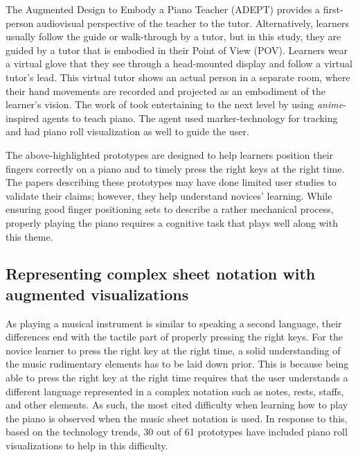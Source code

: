 \documentclass[sigconf, screen, review]{acmart}
\let\xtodo\todo
\renewcommand{\todo}[1]{\xtodo[inline]{#1}}
\newcommand{\todok}[1]{\xtodo[inline,color=green!50]{M and K: #1}}
\begin{document}
The Augmented Design to Embody a Piano Teacher (ADEPT) \cite{gerry2019adept} provides a first-person audiovisual perspective of the teacher to the tutor. Alternatively, learners usually follow the guide or walk-through by a tutor, but in this study, they are guided by a tutor that is embodied in their Point of View (POV). Learners wear a virtual glove that they see through a head-mounted display and follow a virtual tutor's lead. This virtual tutor shows an actual person in a separate room, where their hand movements are recorded and projected as an embodiment of the learner's vision. The work of \cite{goodwin2013key} took entertaining to the next level by using \textit{anime}-inspired agents to teach piano. The agent used marker-technology for tracking and had piano roll visualization as well to guide the user. 

The above-highlighted prototypes are designed to help learners position their fingers correctly on a piano and to timely press the right keys at the right time. The papers describing these prototypes may have done limited user studies to validate their claims; however, they help understand novices' learning. While ensuring good finger positioning sets to describe a rather mechanical process, properly playing the piano requires a cognitive task that plays well along with this theme. 
\todok{Please give feedback. Thank you!}

\subsection{Representing complex sheet notation with augmented visualizations}
As playing a musical instrument is similar to speaking a second language, their differences end with the tactile part of properly pressing the right keys. For the novice learner to press the right key at the right time, a solid understanding of the music rudimentary elements has to be laid down prior. This is because being able to press the right key at the right time requires that the user understands a different language represented in a complex notation such as notes, rests, staffs, and other elements. As such, the most cited difficulty when learning how to play the piano is observed when the music sheet notation is used. In response to this, based on the technology trends, 30 out of 61 prototypes have included piano roll visualizations to help in this difficulty.
\end{document}
